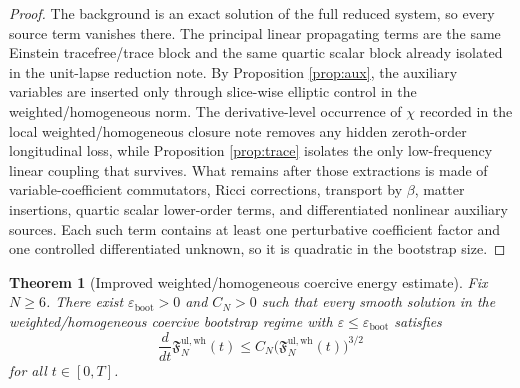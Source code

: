 \documentclass[11pt]{article}
\newtheorem{theorem}{Theorem}
\begin{document}
\begin{proof}
The background is an exact solution of the full reduced system, so every source term vanishes there. The principal linear propagating terms are the same Einstein tracefree/trace block and the same quartic scalar block already isolated in the unit-lapse reduction note. By Proposition \ref{prop:aux}, the auxiliary variables are inserted only through slice-wise elliptic control in the weighted/homogeneous norm. The derivative-level occurrence of \(\chi\) recorded in the local weighted/homogeneous closure note removes any hidden zeroth-order longitudinal loss, while Proposition \ref{prop:trace} isolates the only low-frequency linear coupling that survives. What remains after those extractions is made of variable-coefficient commutators, Ricci corrections, transport by \(\beta\), matter insertions, quartic scalar lower-order terms, and differentiated nonlinear auxiliary sources. Each such term contains at least one perturbative coefficient factor and one controlled differentiated unknown, so it is quadratic in the bootstrap size.
\end{proof}

\begin{theorem}[Improved weighted/homogeneous coercive energy estimate]
\label{thm:ineq}
Fix \(N\ge 6\). There exist \(\varepsilon_{\mathrm{boot}}>0\) and \(C_N>0\) such that every smooth solution in the weighted/homogeneous coercive bootstrap regime with \(\varepsilon\le \varepsilon_{\mathrm{boot}}\) satisfies
\begin{equation}
\frac{d}{dt}\mathfrak F_N^{\mathrm{ul,wh}}(t)
\le
C_N\bigl(\mathfrak F_N^{\mathrm{ul,wh}}(t)\bigr)^{3/2}
\label{eq:quadraticineq}
\end{equation}
for all \(t\in[0,T]\).
\end{theorem}
\end{document}
